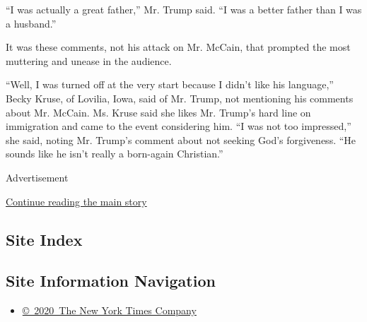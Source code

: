 ``I was actually a great father,'' Mr. Trump said. ``I was a better
father than I was a husband.''

It was these comments, not his attack on Mr. McCain, that prompted the
most muttering and unease in the audience.

``Well, I was turned off at the very start because I didn't like his
language,'' Becky Kruse, of Lovilia, Iowa, said of Mr. Trump, not
mentioning his comments about Mr. McCain. Ms. Kruse said she likes Mr.
Trump's hard line on immigration and came to the event considering him.
``I was not too impressed,'' she said, noting Mr. Trump's comment about
not seeking God's forgiveness. ``He sounds like he isn't really a
born-again Christian.''

Advertisement

\protect\hyperlink{after-bottom}{Continue reading the main story}

\hypertarget{site-index}{%
\subsection{Site Index}\label{site-index}}

\hypertarget{site-information-navigation}{%
\subsection{Site Information
Navigation}\label{site-information-navigation}}

\begin{itemize}
\tightlist
\item
  \href{https://help.nytimes3xbfgragh.onion/hc/en-us/articles/115014792127-Copyright-notice}{©~2020~The
  New York Times Company}
\end{itemize}

